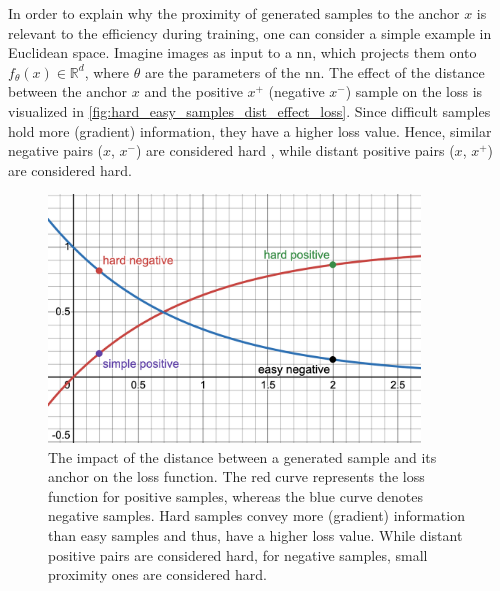 In order to explain why the proximity of generated samples to the anchor $x$ is relevant to the efficiency during training, 
one can consider a simple example in Euclidean space.
Imagine images as input to a \ac{nn}, which projects them onto $f_{\theta}(x) \in \mathbb{R}^d$, 
where $\theta$ are the parameters of the \ac{nn}.
The effect of the distance between the anchor $x$ and the positive $x^+$ (negative $x^-$) 
sample on the loss is visualized in \autoref{fig:hard_easy_samples_dist_effect_loss}.
Since difficult samples hold more (gradient) information, they have a higher loss value.
Hence, similar negative pairs ($x$, $x^-$) are considered hard \citet{robinson_contrastive_2021}, 
while distant positive pairs ($x$, $x^+$) are considered hard.

%     

\begin{figure}[h] %
    \centering
    \includegraphics[width=280pt]{images/Hard_easy_samples_dist_effect_loss_desmos.png}
    \caption{The impact of the distance between a generated sample and its anchor on the loss function.
    The red curve represents the loss function for positive samples, 
    whereas the blue curve denotes negative samples.
    Hard samples convey more (gradient) information than easy samples and thus, have a higher loss value.
    While distant positive pairs are considered hard, for negative samples, small proximity ones are considered hard.}
    \label{fig:hard_easy_samples_dist_effect_loss}
\end{figure}